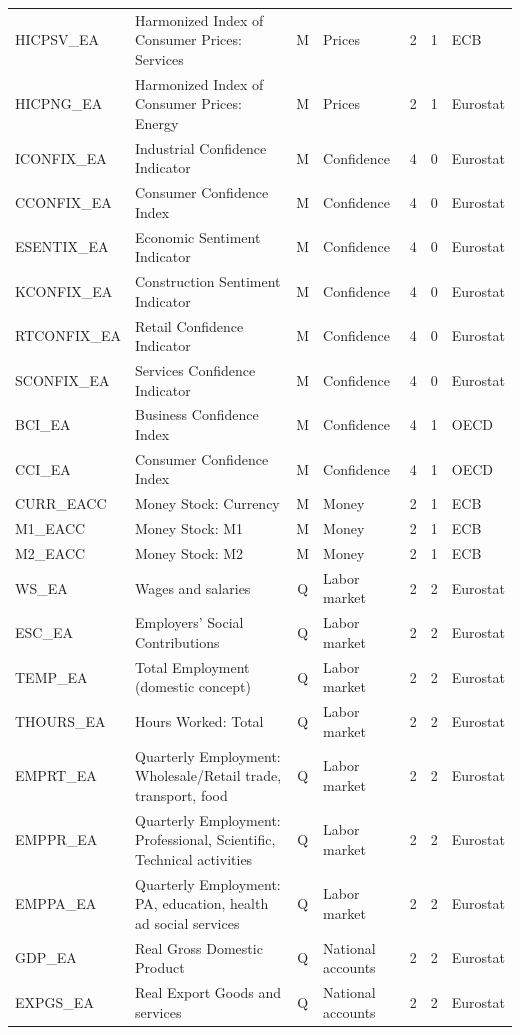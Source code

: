 \begin{longtable}{@{}l>{\raggedright\arraybackslash}p{7.4cm}clrr>{\raggedright\arraybackslash}p{2.6cm}@{}}
HICPSV\_EA & Harmonized Index of Consumer Prices: Services & M & Prices & 2 & 1 & ECB \\
HICPNG\_EA & Harmonized Index of Consumer Prices: Energy & M & Prices & 2 & 1 & Eurostat \\
ICONFIX\_EA & Industrial Confidence Indicator & M & Confidence & 4 & 0 & Eurostat \\
CCONFIX\_EA & Consumer Confidence Index & M & Confidence & 4 & 0 & Eurostat \\
ESENTIX\_EA & Economic Sentiment Indicator & M & Confidence & 4 & 0 & Eurostat \\
KCONFIX\_EA & Construction Sentiment Indicator & M & Confidence & 4 & 0 & Eurostat \\
RTCONFIX\_EA & Retail Confidence Indicator & M & Confidence & 4 & 0 & Eurostat \\
SCONFIX\_EA & Services Confidence Indicator & M & Confidence & 4 & 0 & Eurostat \\
BCI\_EA & Business Confidence Index & M & Confidence & 4 & 1 & OECD \\
CCI\_EA & Consumer Confidence Index & M & Confidence & 4 & 1 & OECD \\
CURR\_EACC & Money Stock: Currency & M & Money & 2 & 1 & ECB \\
M1\_EACC & Money Stock: M1 & M & Money & 2 & 1 & ECB \\
M2\_EACC & Money Stock: M2 & M & Money & 2 & 1 & ECB \\
WS\_EA & Wages and salaries & Q & Labor market & 2 & 2 & Eurostat \\
ESC\_EA & Employers’ Social Contributions & Q & Labor market & 2 & 2 & Eurostat \\
TEMP\_EA & Total Employment (domestic concept) & Q & Labor market & 2 & 2 & Eurostat \\
THOURS\_EA & Hours Worked: Total & Q & Labor market & 2 & 2 & Eurostat \\
EMPRT\_EA & Quarterly Employment: Wholesale/Retail trade, transport, food & Q & Labor market & 2 & 2 & Eurostat \\
EMPPR\_EA & Quarterly Employment: Professional, Scientific, Technical activities & Q & Labor market & 2 & 2 & Eurostat \\
EMPPA\_EA & Quarterly Employment: PA, education, health ad social services & Q & Labor market & 2 & 2 & Eurostat \\
GDP\_EA & Real Gross Domestic Product & Q & National accounts & 2 & 2 & Eurostat \\
EXPGS\_EA & Real Export Goods and services & Q & National accounts & 2 & 2 & Eurostat \\

\end{longtable}
